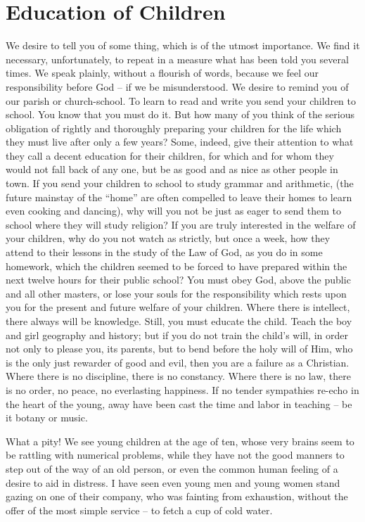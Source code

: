 \chapter{Education of Children}

We desire to tell you of some thing, 
which is of the utmost importance. We 
find it necessary, unfortunately, to repeat in a 
measure what has been told you several times. 
We speak plainly, without a flourish of words, 
because we feel our responsibility before God -- 
if we be misunderstood. We desire to remind 
you of our parish or church-school. To learn 
to read and write you send your children to 
school. You know that you must do it. But 
how many of you think of the serious obligation 
of rightly and thoroughly preparing your 
children for the life which they must live after 
only a few years? Some, indeed, give their 
attention to what they call a decent education 
for their children, for which and for whom they 
would not fall back of any one, but be as good 
and as nice as other people in town. If you 
send your children to school to study grammar 
and arithmetic, (the future mainstay of the 
``home'' are often compelled to leave their homes 
to learn even cooking and dancing), why will 
you not be just as eager to send them to school 
where they will study religion? If you are 
truly interested in the welfare of your children, 
why do you not watch as strictly, but once a week, 
how they attend to their lessons in the study of 
the Law of God, as you do in some homework, 
which the children seemed to be forced to have 
prepared within the next twelve hours for their 
public school? You must obey God, above the 
public and all other masters, or lose your souls 
for the responsibility which rests upon you for 
the present and future welfare of your children. 
Where there is intellect, there always will be 
knowledge. Still, you must educate the child. 
Teach the boy and girl geography and history; 
but if you do not train the child's will, in order 
not only to please you, its parents, but to bend 
before the holy will of Him, who is the only 
just rewarder of good and evil, then you are a 
failure as a Christian. Where there is no discipline,
there is no constancy. Where there is 
no law, there is no order, no peace, no everlasting
happiness. If no tender sympathies re-echo 
in the heart of the young, away have been cast 
the time and labor in teaching -- be it botany or 
music.

What a pity! We see young children at the 
age of ten, whose very brains seem to be rattling 
with numerical problems, while they have not 
the good manners to step out of the way of an 
old person, or even the common human feeling 
of a desire to aid in distress. I have seen even 
young men and young women stand gazing on 
one of their company, who was fainting from 
exhaustion, without the offer of the most simple 
service -- to fetch a cup of cold water. 

